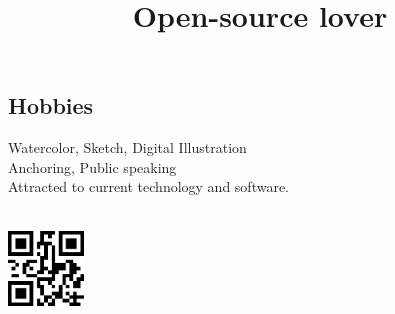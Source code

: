 \documentclass[mm]{simple_style}
\begin{document}
\begin{resume}
\section{Hobbies}
\begin{project}
\title{Open-source lover}
\end{project}
 Watercolor, Sketch, Digital Illustration\\
 Anchoring, Public speaking\\
 Attracted to current technology and software.\\
\hspace\\
\vspace{-2ex}
\sectionline
\vspace{100mm}
\begin{center}
\hspace{-200mm}
    \includegraphics[width=20mm, hight=20mm right]{qr/qrTel.png}\\
\end{center}
\end{resume}
\end{document}

